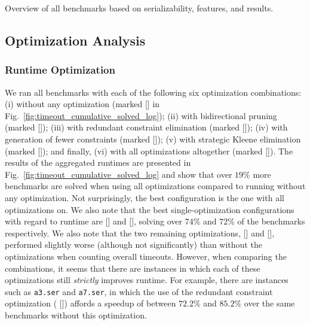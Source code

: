 \begin{table}[htbp]
	\centering
	
	\caption{Overview of all benchmarks based on serializability, features, and results.}
\label{tab:benchmarks-all}
\end{table}


\subsection{Optimization Analysis}
\label{subsec:optimization-results}

%

\subsubsection{Runtime Optimization}

We ran all benchmarks with each of the following six optimization combinations: 
(i) without any optimization (marked [\texttt{\textbf{\text{-}\text{-}\text{-}\text{-}}}] in Fig.~\ref{fig:timeout_cumulative_solved_log}); (ii) with bidirectional pruning (marked [\texttt{\textbf{\text{-}\text{-}\text{-}}}]); (iii) with redundant constraint elimination (marked [\texttt{\textbf{\text{-}\text{-}\text{-}}}]); (iv) with generation of fewer constraints (marked [\texttt{\textbf{\text{-}\text{-}\text{-}}}]);
(v) with strategic Kleene elimination (marked [\texttt{\textbf{\text{-}\text{-}\text{-}}}]);
and finally, (vi) with all optimizations altogether (marked [\texttt{\textbf{}}]).
%
The results of the aggregated runtimes are presented in Fig.~\ref{fig:timeout_cumulative_solved_log} and show that over $19\%$ more benchmarks are solved when using all optimizations compared to running without any optimization.
%
Not surprisingly, the best configuration is the one with all optimizations on. 
%
We also note that the best single-optimization configurations with regard to runtime are [\texttt{\textbf{\text{-}\text{-}\text{-}}}] and [\texttt{\textbf{\text{-}\text{-}\text{-}}}], solving over $74\%$ and $72\%$ of the benchmarks respectively. 
%
We also note that the two remaining optimizations, [\texttt{\textbf{\text{-}\text{-}\text{-}}}] and [\texttt{\textbf{\text{-}\text{-}\text{-}}}], performed slightly worse (although not significantly) than without the optimizations when counting overall timeouts.
%
However, when comparing the combinations, it seems that there are instances in which each of these optimizations still \textit{strictly} improves runtime.
%
For example, there are instances such as \texttt{a3.ser} and \texttt{a7.ser}, in which the use of the redundant constraint optimization (  [\texttt{\textbf{\text{-}\text{-}\text{-}}}])
affords a speedup of between $72.2\%$ and $85.2\%$ over the same benchmarks without this optimization.


